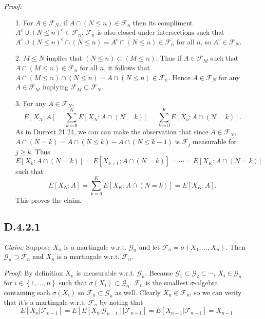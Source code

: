 \documentclass[10pt]{article}
\begin{document}
\textit{Proof:} 
\begin{itemize}
  \item [1.]
  For $A \in \mathcal{F}_N$, if $A \cap (N \le n) \in \mathcal{F}_n$ then its
  compliment $A^c \cup (N \le n)^c \in \mathcal{F}_n$. 
  $\mathcal{F}_n$ is also closed under intersections such that 
  $A^c \cup (N \le n)^c \cap (N \le n) = A^c \cap (N \le n) 
  \in \mathcal{F}_n$ for all $n$, so $A^c \in \mathcal{F}_N$.

  \item [2.]
  $M \le N$ implies that $(N \le n) \subset (M \le n)$.
  Thus if $A \in \mathcal{F}_M$ such that $A \cap (M \le n) \in \mathcal{F}_n$
  for all $n$, it follows that $A \cap (M \le n) \cap (N \le n)
  = A \cap (N \le n) \in \mathcal{F}_n$. Hence $A \in \mathcal{F}_N$
  for any $A \in \mathcal{F}_M$ implying $\mathcal{F}_M \subset \mathcal{F}_N$.

  \item [3.]
  For any $A \in \mathcal{F}_N$,
  \begin{equation*}
    E\left[X_N; A\right] = \sum_{k=0}^K E\left[X_N; A \cap (N=k)\right]
    = \sum_{k=0}^K E\left[X_k; A \cap (N=k)\right].
  \end{equation*}
  As in Durrett 21.24, we can can make the observation that
  since $A \in \mathcal{F}_N$,
  $A \cap (N=k) = A \cap (N \le k) - A \cap (N \le k-1)$
  is $\mathcal{F}_j$ measurable for $j \ge k$.
  Thus
  \begin{equation*}
    E\left[X_k; A \cap (N=k)\right]
    =  E\left[X_{k+1}; A \cap (N=k)\right]
    = \cdots =  E\left[X_K; A \cap (N=k)\right]
  \end{equation*}
  such that 
  \begin{equation*}
    E\left[X_N; A\right] = \sum_{k=0}^K E\left[X_K; A \cap (N=k)\right]
    = E \left[X_K; A \right].
  \end{equation*}
  This proves the claim.
\end{itemize}

\subsection*{D.4.2.1}
\textit{Claim:} Suppose $X_n$ is a martingale w.r.t. $\mathcal{G}_n$
and let $\mathcal{F}_n = \sigma(X_1, \dots, X_n)$.
Then $\mathcal{G}_n \supset \mathcal{F}_n$ and $X_n$ is a martingale
w.r.t. $\mathcal{F}_n$.

\textit{Proof:} By definition $X_n$ is measurable w.r.t. $\mathcal{G}_n$.
Because $\mathcal{G}_1 \subset \mathcal{G}_2 \subset \cdots$,
$X_i \in \mathcal{G}_n$ for 
$i \in \left\{1,\dots, n\right\}$
such that $\sigma(X_i) \subset \mathcal{G}_n$. 
$\mathcal{F}_n$ is the smallest $\sigma$-algebra containing
each $\sigma(X_i)$
so $\mathcal{F}_n \subset \mathcal{G}_n$ as well.
Clearly $X_n \in \mathcal{F}_n$, so we can verify that it's
a martingale w.r.t. $\mathcal{F}_n$ by noting that
$$E[X_n \vert \mathcal{F}_{n-1}] 
= E[E[X_n \vert \mathcal{G}_{n-1}] \vert \mathcal{F}_{n-1}]
= E[X_{n-1} \vert \mathcal{F}_{n-1}] = X_{n-1}$$
\end{document}
